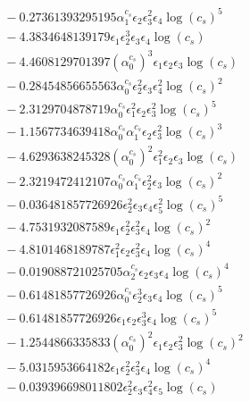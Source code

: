 \documentclass[10pt]{article}
\begin{document}
\begin{align*}
&{}  - 0.27361393295195 \alpha_{1}^{c_s} \epsilon_{2} \epsilon_{3}^{2} \epsilon_{4} \log{\left(c_{s} \right)}^{5} \\
&{}  - 4.3834648139179 \epsilon_{1} \epsilon_{2}^{3} \epsilon_{3} \epsilon_{4} \log{\left(c_{s} \right)} \\
&{}  - 4.4608129701397 \left(\alpha_{0}^{c_s}\right)^{3} \epsilon_{1} \epsilon_{2} \epsilon_{3} \log{\left(c_{s} \right)} \\
&{}  - 0.28454856655563 \alpha_{0}^{c_s} \epsilon_{2}^{2} \epsilon_{3} \epsilon_{4}^{2} \log{\left(c_{s} \right)}^{2} \\
&{}  - 2.3129704878719 \alpha_{0}^{c_s} \epsilon_{1}^{2} \epsilon_{2} \epsilon_{3}^{2} \log{\left(c_{s} \right)}^{5} \\
&{}  - 1.1567734639418 \alpha_{0}^{c_s} \alpha_{1}^{c_s} \epsilon_{2} \epsilon_{3}^{2} \log{\left(c_{s} \right)}^{3} \\
&{}  - 4.6293638245328 \left(\alpha_{0}^{c_s}\right)^{2} \epsilon_{1}^{2} \epsilon_{2} \epsilon_{3} \log{\left(c_{s} \right)} \\
&{}  - 2.3219472412107 \alpha_{0}^{c_s} \alpha_{1}^{c_s} \epsilon_{2}^{2} \epsilon_{3} \log{\left(c_{s} \right)}^{2} \\
&{}  - 0.036481857726926 \epsilon_{2}^{2} \epsilon_{3} \epsilon_{4} \epsilon_{5}^{2} \log{\left(c_{s} \right)}^{5} \\
&{}  - 4.7531932087589 \epsilon_{1} \epsilon_{2}^{2} \epsilon_{3}^{2} \epsilon_{4} \log{\left(c_{s} \right)}^{2} \\
&{}  - 4.8101468189787 \epsilon_{1}^{2} \epsilon_{2} \epsilon_{3}^{2} \epsilon_{4} \log{\left(c_{s} \right)}^{4} \\
&{}  - 0.019088721025705 \alpha_{2}^{c_s} \epsilon_{2} \epsilon_{3} \epsilon_{4} \log{\left(c_{s} \right)}^{4} \\
&{}  - 0.61481857726926 \alpha_{0}^{c_s} \epsilon_{2}^{3} \epsilon_{3} \epsilon_{4} \log{\left(c_{s} \right)}^{5} \\
&{}  - 0.61481857726926 \epsilon_{1} \epsilon_{2} \epsilon_{3}^{3} \epsilon_{4} \log{\left(c_{s} \right)}^{5} \\
&{}  - 1.2544866335833 \left(\alpha_{0}^{c_s}\right)^{2} \epsilon_{1} \epsilon_{2} \epsilon_{3}^{2} \log{\left(c_{s} \right)}^{2} \\
&{}  - 5.0315953664182 \epsilon_{1} \epsilon_{2}^{2} \epsilon_{3}^{2} \epsilon_{4} \log{\left(c_{s} \right)}^{4} \\
&{}  - 0.039396698011802 \epsilon_{2}^{2} \epsilon_{3} \epsilon_{4}^{2} \epsilon_{5} \log{\left(c_{s} \right)} \\

\end{align*}
\end{document}
